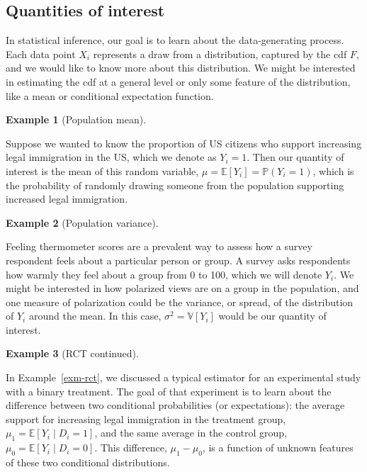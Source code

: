\documentclass[
  letterpaper,
  DIV=11,
  numbers=noendperiod]{scrreprt}
\newcommand{\E}{\mathbb{E}}
\newcommand{\V}{\mathbb{V}}
\renewcommand{\P}{\mathbb{P}}
\theoremstyle{definition}
\theoremstyle{plain}
\theoremstyle{definition}
\newtheorem{example}{Example}[chapter]
\theoremstyle{remark}
\begin{document}
\hypertarget{quantities-of-interest}{%
\subsection{Quantities of interest}\label{quantities-of-interest}}

In statistical inference, our goal is to learn about the data-generating
process. Each data point \(X_i\) represents a draw from a distribution,
captured by the cdf \(F\), and we would like to know more about this
distribution. We might be interested in estimating the cdf at a general
level or only some feature of the distribution, like a mean or
conditional expectation function.

\begin{example}[Population
mean]\protect\hypertarget{exm-prop}{}\label{exm-prop}

Suppose we wanted to know the proportion of US citizens who support
increasing legal immigration in the US, which we denote as \(Y_i = 1\).
Then our quantity of interest is the mean of this random variable,
\(\mu = \E[Y_i] = \P(Y_{i} = 1)\), which is the probability of randomly
drawing someone from the population supporting increased legal
immigration.

\end{example}

\begin{example}[Population
variance]\protect\hypertarget{exm-var}{}\label{exm-var}

Feeling thermometer scores are a prevalent way to assess how a survey
respondent feels about a particular person or group. A survey asks
respondents how warmly they feel about a group from 0 to 100, which we
will denote \(Y_i\). We might be interested in how polarized views are
on a group in the population, and one measure of polarization could be
the variance, or spread, of the distribution of \(Y_i\) around the mean.
In this case, \(\sigma^2 = \V[Y_i]\) would be our quantity of interest.

\end{example}

\begin{example}[RCT
continued]\protect\hypertarget{exm-rct-ii}{}\label{exm-rct-ii}

In Example~\ref{exm-rct}, we discussed a typical estimator for an
experimental study with a binary treatment. The goal of that experiment
is to learn about the difference between two conditional probabilities
(or expectations): the average support for increasing legal immigration
in the treatment group, \(\mu_1 = \E[Y_i \mid D_i = 1]\), and the same
average in the control group, \(\mu_0 = \E[Y_i \mid D_i = 0]\). This
difference, \(\mu_1 - \mu_0\), is a function of unknown features of
these two conditional distributions.

\end{example}
\end{document}
